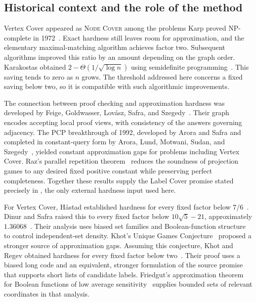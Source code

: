 \subsection{Historical context and the role of the method}

Vertex Cover appeared as \textsc{Node Cover} among the problems
Karp proved NP-complete in 1972~\cite{Karp1972}. Exact hardness
still leaves room for approximation, and the elementary
maximal-matching algorithm achieves factor two. Subsequent algorithms
improved this ratio by an amount depending on the graph order.
Karakostas obtained \(2-\Theta(1/\sqrt{\log n})\) using semidefinite
programming~\cite{Karakostas2009}. This saving tends to zero as
\(n\) grows. The threshold addressed here concerns a fixed saving
below two, so it is compatible with such algorithmic improvements.

The connection between proof checking and approximation hardness
was developed by Feige, Goldwasser, Lov\'asz, Safra, and
Szegedy~\cite{FGLSS96}. Their graph encodes accepting local proof
views, with consistency of the answers governing adjacency.
The PCP breakthrough of 1992, developed by Arora and Safra and
completed in constant-query form by Arora, Lund, Motwani, Sudan,
and Szegedy~\cite{AroraSafra98,ALMSS98}, yielded constant
approximation gaps for problems including Vertex Cover. Raz's
parallel repetition theorem~\cite{Raz1998} reduces the soundness
of projection games to any desired fixed positive constant while
preserving perfect completeness. Together these results supply the
Label Cover promise stated precisely in , the
only external hardness input used here.

For Vertex Cover, H{\aa}stad established hardness for every fixed
factor below \(7/6\)~\cite[Theorem~8.1]{Hastad2001}.
Dinur and Safra raised this to every fixed factor below
\(10\sqrt5-21\), approximately \(1.36068\)~\cite[Theorem~1.1]{DinurSafra2005}.
Their analysis uses biased set families and Boolean-function
structure to control independent-set density. Khot's Unique Games
Conjecture~\cite{Khot02} proposed a stronger source of approximation
gaps. Assuming this conjecture, Khot and Regev obtained hardness
for every fixed factor below two~\cite{KhotRegev2008}. Their proof
uses a biased long code and an equivalent, stronger formulation
of the source promise that supports short lists of candidate labels.
Friedgut's approximation theorem for Boolean functions of low
average sensitivity~\cite{Friedgut1998} supplies bounded sets of
relevant coordinates in that analysis.


